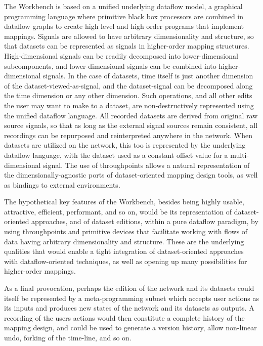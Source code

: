 \documentclass[main.tex]{subfiles}
\begin{document}
The Workbench is based on a unified underlying dataflow model, a graphical
programming language where primitive black box processors are combined in
dataflow graphs to create high level and high order programs that implement
mappings. Signals are allowed to have arbitrary dimensionality and structure,
so that datasets can be represented as signals in higher-order mapping
structures. High-dimensional signals can be readily decomposed into
lower-dimensional subcomponents, and lower-dimensional signals can be combined
into higher-dimensional signals. In the case of datasets, time itself is just
another dimension of the dataset-viewed-as-signal, and the dataset-signal can
be decomposed along the time dimension or any other dimension. Such operations,
and all other edits the user may want to make to a dataset, are
non-destructively represented using the unified dataflow language. All recorded
datasets are derived from original raw source signals, so that as long as the
external signal sources remain consistent, all recordings can be repurposed and
reinterpreted anywhere in the network. When datasets are utilized on the
network, this too is represented by the underlying dataflow language, with the
dataset used as a constant offset value for a multi-dimensional signal. The use
of throughpoints allows a natural representation of the dimensionally-agnostic
ports of dataset-oriented mapping design tools, as well as bindings to external
environments.

The hypothetical key features of the Workbench, besides being highly usable,
attractive, efficient, performant, and so on, would be its representation of
dataset-oriented approaches, and of dataset editions, within a pure dataflow
paradigm, by using throughpoints and primitive devices that facilitate working
with flows of data having arbitrary dimensionality and structure.
These are the underlying qualities that would enable a tight integration
of dataset-oriented approaches with dataflow-oriented techniques, as well as
opening up many possibilities for higher-order mappings.

As a final provocation, perhaps the edition of the network and its datasets
could itself be represented by a meta-programming subnet which accepts user
actions as its inputs and produces new states of the network and its datasets
as outputs. A recording of the users actions would then constitute a complete
history of the mapping design, and could be used to generate a version history,
allow non-linear undo, forking of the time-line, and so on.
\end{document}
